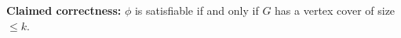 \documentclass[11pt]{article}
\begin{document}
\noindent
\textbf{Claimed correctness:} $\phi$ is satisfiable if and only if $G$ has a vertex cover of size $\le k$.


\end{document}
